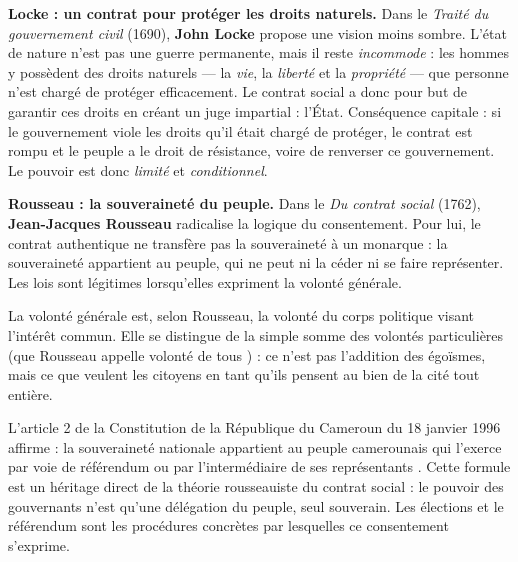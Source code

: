 \documentclass[11pt]{article}
\newcommand{\cle}[1]{{\popxbold\color{popdark}#1}}
\begin{document}
\textbf{Locke : un contrat pour protéger les droits naturels.} Dans le \emph{Traité du gouvernement civil} (1690), \textbf{John Locke} propose une vision moins sombre. L'état de nature n'est pas une guerre permanente, mais il reste \emph{incommode} : les hommes y possèdent des \cle{droits naturels} — la \emph{vie}, la \emph{liberté} et la \emph{propriété} — que personne n'est chargé de protéger efficacement. Le contrat social a donc pour but de garantir ces droits en créant un juge impartial : l'État. Conséquence capitale : si le gouvernement viole les droits qu'il était chargé de protéger, le contrat est rompu et le peuple a le \cle{droit de résistance}, voire de renverser ce gouvernement. Le pouvoir est donc \emph{limité} et \emph{conditionnel}.

\textbf{Rousseau : la souveraineté du peuple.} Dans le \emph{Du contrat social} (1762), \textbf{Jean-Jacques Rousseau} radicalise la logique du consentement. Pour lui, le contrat authentique ne transfère pas la souveraineté à un monarque : la \cle{souveraineté appartient au peuple}, qui ne peut ni la céder ni se faire représenter. Les lois sont légitimes lorsqu'elles expriment la \cle{volonté générale}.

\begin{definition}
La \cle{volonté générale} est, selon Rousseau, la volonté du corps politique visant l'intérêt commun. Elle se distingue de la simple somme des volontés particulières (que Rousseau appelle \og volonté de tous \fg) : ce n'est pas l'addition des égoïsmes, mais ce que veulent les citoyens en tant qu'ils pensent au bien de la cité tout entière.
\end{definition}

\begin{exemplebox}
L'article 2 de la Constitution de la République du Cameroun du 18 janvier 1996 affirme : \og la souveraineté nationale appartient au peuple camerounais qui l'exerce par voie de référendum ou par l'intermédiaire de ses représentants \fg. Cette formule est un héritage direct de la théorie rousseauiste du contrat social : le pouvoir des gouvernants n'est qu'une délégation du peuple, seul souverain. Les élections et le référendum sont les procédures concrètes par lesquelles ce consentement s'exprime.
\end{exemplebox}
\end{document}
